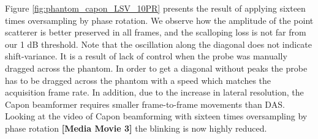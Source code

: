 \documentclass[draftcls]{IEEEtran}
\newcommand\multimedia[1]{\textbf{{\color{red}[#1]}}}
\begin{document}
Figure \ref{fig:phantom_capon_LSV_10PR} presents the result of applying sixteen times oversampling by phase rotation. We observe how the amplitude of the point scatterer is better preserved in all frames, and the scalloping loss is not far from our 1 dB threshold. Note that the oscillation along the diagonal does not indicate shift-variance. It is a result of lack of control when the probe was manually dragged across the phantom. In order to get a diagonal without peaks the probe has to be dragged across the phantom with a speed which matches the acquisition frame rate. In addition, due to the increase in lateral resolution, the Capon beamformer requires smaller frame-to-frame movements than DAS. Looking at the video of Capon beamforming with sixteen times oversampling by phase rotation \multimedia{Media Movie 3} the blinking is now highly reduced. %



\end{document}
